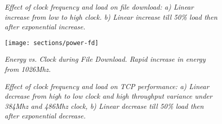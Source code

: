 
\begin{figure}[t!]

     \caption{\textit{ Effect of clock frequency and load on file download: a) Linear increase from low to high clock. b) Linear increase till 50\% load then after exponential increase.}}
     \label{fig:cycle-freq}
\end{figure}

\begin{figure}[t]
      \centering
        \texttt{[image: sections/power-fd]}
          \caption{\textit{Energy vs. Clock during File Download. Rapid increase in energy from 1026Mhz.}}
            \label{fig:power-fd}
\end{figure}

\begin{figure}[t]

     \caption{\textit{ Effect of clock frequency and load on TCP performance: a) Linear decrease from high to low clock and high throughput variance under 384Mhz and 486Mhz clock, b) Linear decrease till 50\% load then after exponential decrease.}}
     \vspace{-0.25in}
     \label{fig:cycle-tcp}
\end{figure}
